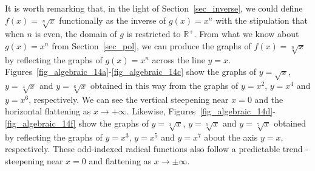 It is worth remarking that, in the light of Section~\ref{sec_inverse}, we could define $f(x) = \sqrt[n]{x}$ functionally as the inverse of $g(x) = x^n$ with the stipulation that when $n$ is even, the domain of $g$ is restricted to $\mathbb{R}^+$. From what we know about $g(x) = x^n$ from Section~\ref{sec_pol}, we can produce the graphs of $f(x) = \sqrt[n]{x}$ by reflecting the graphs of $g(x) = x^n$ across the line $y=x$.  Figures~\ref{fig_algebraic_14a}-\ref{fig_algebraic_14c} show the graphs of $y=\sqrt{x}$, $y=\sqrt[4]{x}$ and $y=\sqrt[6]{x}$ obtained in this way from the graphs of $y=x^2$, $y=x^4$ and $y=x^6$, respectively.  We can see the vertical steepening near $x=0$ and the horizontal flattening as $x \rightarrow +\infty$. Likewise, Figures~\ref{fig_algebraic_14d}-\ref{fig_algebraic_14f} show the graphs of $y=\sqrt[3]{x}$, $y=\sqrt[5]{x}$ and $y=\sqrt[7]{x}$ obtained by reflecting the graphs of $y=x^3$, $y=x^5$ and $y=x^7$ about the axis $y=x$, respectively. These odd-indexed radical functions also follow a predictable trend - steepening near $x = 0$ and flattening as $x \rightarrow \pm \infty$.



